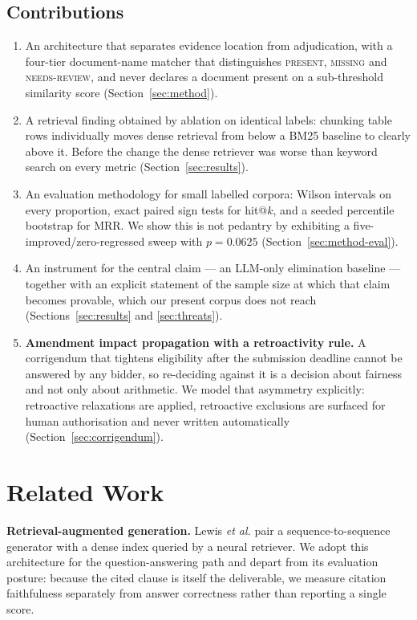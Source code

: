 \documentclass[conference]{IEEEtran}
\begin{document}
\subsection{Contributions}

\begin{enumerate}
  \item An architecture that separates evidence location from adjudication,
  with a four-tier document-name matcher that distinguishes \textsc{present},
  \textsc{missing} and \textsc{needs-review}, and never declares a document
  present on a sub-threshold similarity score (Section~\ref{sec:method}).
  \item A retrieval finding obtained by ablation on identical labels: chunking
  table rows individually moves dense retrieval from below a BM25 baseline to
  clearly above it. Before the change the dense retriever was worse than
  keyword search on every metric (Section~\ref{sec:results}).
  \item An evaluation methodology for small labelled corpora: Wilson intervals
  on every proportion, exact paired sign tests for hit@$k$, and a seeded
  percentile bootstrap for MRR. We show this is not pedantry by exhibiting a
  five-improved/zero-regressed sweep with $p=0.0625$
  (Section~\ref{sec:method-eval}).
  \item An instrument for the central claim --- an LLM-only elimination
  baseline --- together with an explicit statement of the sample size at which
  that claim becomes provable, which our present corpus does not reach
  (Sections~\ref{sec:results} and \ref{sec:threats}).
  \item \textbf{Amendment impact propagation with a retroactivity rule.} A
  corrigendum that tightens eligibility after the submission deadline cannot be
  answered by any bidder, so re-deciding against it is a decision about
  fairness and not only about arithmetic. We model that asymmetry explicitly:
  retroactive relaxations are applied, retroactive exclusions are surfaced for
  human authorisation and never written automatically
  (Section~\ref{sec:corrigendum}).
\end{enumerate}

\section{Related Work}
\label{sec:related}

\textbf{Retrieval-augmented generation.} Lewis \textit{et al.}
\cite{lewis2020rag} pair a sequence-to-sequence generator with a dense index
queried by a neural retriever. We adopt this architecture for the
question-answering path and depart from its evaluation posture: because the
cited clause is itself the deliverable, we measure citation faithfulness
separately from answer correctness rather than reporting a single score.
\end{document}
